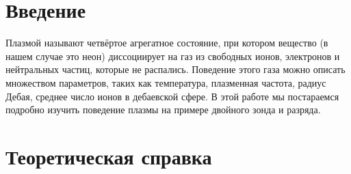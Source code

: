 

\newcommand{\artitle}{Изучение плазмы газового\\[9pt] разряда в неоне}

\newcommand{\arabstract}{В работе изучается плазма газового разряда в неоне, ВАХ разряда и описание свойств полученной плазмы с помощью некоторых параметров.}

\newcommand{\imageheight}{8cm}





\section{Введение}
Плазмой называют четвёртое агрегатное состояние, при котором вещество (в нашем случае это неон) диссоциирует на газ из свободных ионов, электронов и нейтральных частиц, которые не распались. Поведение этого газа можно описать множеством параметров, таких как температура, плазменная частота, радиус Дебая, среднее число ионов в дебаевской сфере. В этой работе мы постараемся подробно изучить поведение плазмы на примере двойного зонда и разряда.

\section{Теоретическая справка}

